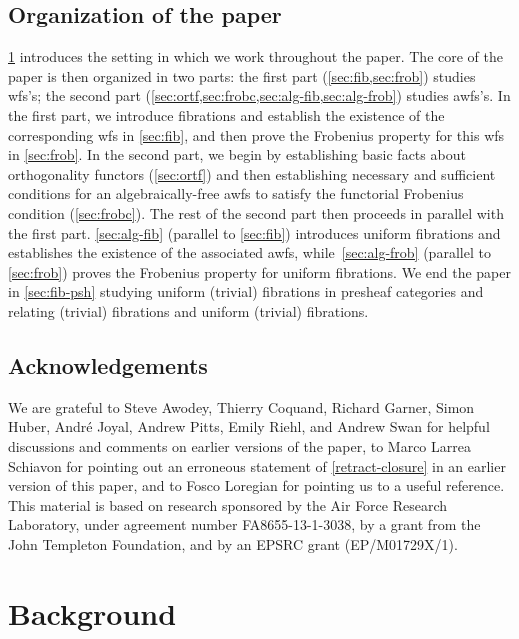 \documentclass[reqno,10pt,a4paper,oneside,draft]{amsart}
\begin{document}
\subsection*{Organization of the paper} \cref{sec:bac} introduces the setting in which we work throughout the paper.
The core of the paper is then organized in two parts: the first part (\cref{sec:fib,sec:frob}) studies wfs's; the second part (\cref{sec:ortf,sec:frobc,sec:alg-fib,sec:alg-frob}) studies awfs's.
In the first part, we introduce fibrations and establish the existence of the corresponding wfs in \cref{sec:fib}, and then prove the Frobenius property for this wfs in \cref{sec:frob}.
In the second part, we begin by establishing basic facts about orthogonality functors (\cref{sec:ortf}) and then establishing necessary and sufficient conditions for an algebraically-free awfs to satisfy the functorial Frobenius condition (\cref{sec:frobc}).
The rest of the second part then proceeds in parallel with the first part.
\cref{sec:alg-fib} (parallel to \cref{sec:fib}) introduces uniform fibrations and establishes the existence of the associated awfs, while~\cref{sec:alg-frob} (parallel to \cref{sec:frob}) proves the Frobenius property for uniform fibrations.
We end the paper in \cref{sec:fib-psh} studying uniform (trivial) fibrations in presheaf categories and relating (trivial) fibrations and uniform (trivial) fibrations.

\subsection*{Acknowledgements}

We are grateful to Steve Awodey, Thierry Coquand, Richard Garner, Simon Huber, Andr\'e Joyal, Andrew Pitts, Emily Riehl, and Andrew Swan for helpful discussions and comments on earlier versions of the paper, to Marco Larrea Schiavon for pointing out an erroneous statement of \cref{retract-closure} in an earlier version of this paper, and to Fosco Loregian for pointing us to a useful reference.
This material is based on research sponsored by the Air Force Research Laboratory, under agreement number FA8655-13-1-3038, by a grant from the John Templeton Foundation, and by an EPSRC grant (EP/M01729X/1).

\section{Background}
\label{sec:bac}
\end{document}
